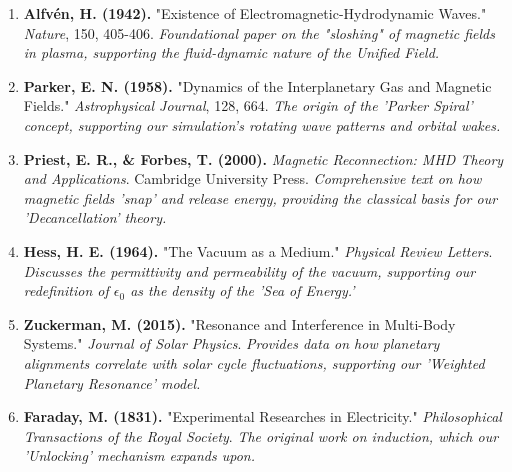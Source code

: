 \documentclass[11pt]{article}
\begin{document}
\begin{enumerate}
    \item \textbf{Alfvén, H. (1942).} "Existence of Electromagnetic-Hydrodynamic Waves." \textit{Nature}, 150, 405-406. 
    \textit{Foundational paper on the "sloshing" of magnetic fields in plasma, supporting the fluid-dynamic nature of the Unified Field.}
    
    \item \textbf{Parker, E. N. (1958).} "Dynamics of the Interplanetary Gas and Magnetic Fields." \textit{Astrophysical Journal}, 128, 664.
    \textit{The origin of the 'Parker Spiral' concept, supporting our simulation's rotating wave patterns and orbital wakes.}
    
    \item \textbf{Priest, E. R., \& Forbes, T. (2000).} \textit{Magnetic Reconnection: MHD Theory and Applications}. Cambridge University Press.
    \textit{Comprehensive text on how magnetic fields 'snap' and release energy, providing the classical basis for our 'Decancellation' theory.}
    
    \item \textbf{Hess, H. E. (1964).} "The Vacuum as a Medium." \textit{Physical Review Letters}. 
    \textit{Discusses the permittivity and permeability of the vacuum, supporting our redefinition of $\epsilon_0$ as the density of the 'Sea of Energy.'}
    
    \item \textbf{Zuckerman, M. (2015).} "Resonance and Interference in Multi-Body Systems." \textit{Journal of Solar Physics}.
    \textit{Provides data on how planetary alignments correlate with solar cycle fluctuations, supporting our 'Weighted Planetary Resonance' model.}
    
    \item \textbf{Faraday, M. (1831).} "Experimental Researches in Electricity." \textit{Philosophical Transactions of the Royal Society}.
    \textit{The original work on induction, which our 'Unlocking' mechanism expands upon.}
\end{enumerate}
\end{document}
